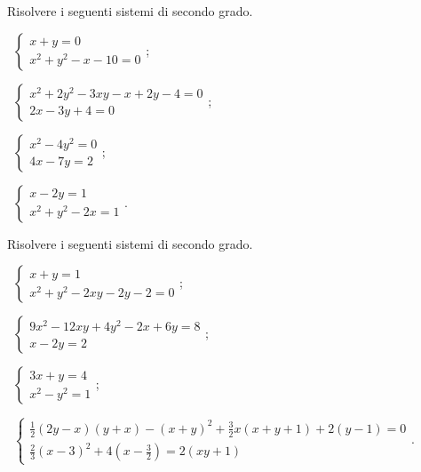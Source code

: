 \begin{esercizio}[\Ast]
\label{ese:6.6}
Risolvere i seguenti sistemi di secondo grado.
\begin{multicols}{2}
 \begin{enumeratea}
 \item~$\left\{\begin{array}{l}x+y=0\\x^2+y^2-x-10=0\end{array}\right.$;
 \item~$\left\{\begin{array}{l}x^2+2y^2-3xy-x+2y-4=0\\2x-3y+4=0\end{array}\right.$;
 \item~$\left\{\begin{array}{l}x^2-4y^2=0\\4x-7y=2\end{array}\right.$;
 \item~$\left\{\begin{array}{l}x-2y=1\\x^2+y^2-2x=1\end{array}\right.$.
 \end{enumeratea}
 \end{multicols}
\end{esercizio}
\pagebreak
\begin{esercizio}[\Ast]
 \label{ese:6.7}
Risolvere i seguenti sistemi di secondo grado.
 \begin{enumeratea}
 \item~$\left\{\begin{array}{l}x+y=1\\x^2+y^2-2xy-2y-2=0\end{array}\right.$;
 \item~$\left\{\begin{array}{l}9x^2-12xy+4y^2-2x+6y=8\\x-2y=2\end{array}\right.$;
 \item~$\left\{\begin{array}{l}3x+y=4\\x^2-y^2=1\end{array}\right.$;
 \item~$\left\{\begin{array}{l}\frac 1 2(2y-x)(y+x)-(x+y)^2+\frac 3 2x(x+y+1)+2(y-1)=0\\\frac 2 3(x-3)^2+4\left(x-\frac 3 2\right)=2({xy}+1)\end{array}\right.$.
 \end{enumeratea}
\end{esercizio}

